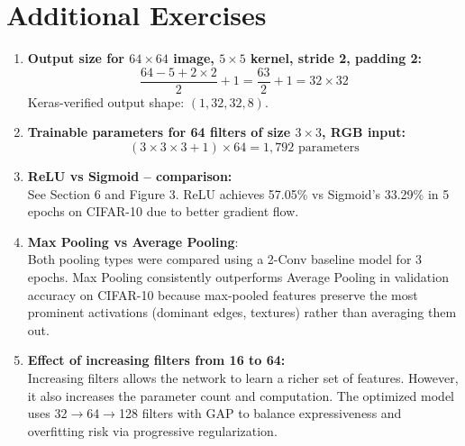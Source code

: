 \documentclass[11pt]{article}
\begin{document}
\section{Additional Exercises}

\begin{enumerate}
    \item \textbf{Output size for $64\times64$ image, $5\times5$ kernel, stride 2, padding 2:}
    $$\frac{64 - 5 + 2 \times 2}{2} + 1 = \frac{63}{2} + 1 = 32 \times 32$$
    Keras-verified output shape: $(1, 32, 32, 8)$.

    \item \textbf{Trainable parameters for 64 filters of size $3\times3$, RGB input:}
    $$(3 \times 3 \times 3 + 1) \times 64 = 1{,}792 \text{ parameters}$$

    \item \textbf{ReLU vs Sigmoid -- comparison:}\\
    See Section 6 and Figure 3. ReLU achieves 57.05\% vs Sigmoid's 33.29\% in 5 epochs on CIFAR-10 due to better gradient flow.

    \item \textbf{Max Pooling vs Average Pooling}:\\ Both pooling types were compared using a 2-Conv baseline model for 3 epochs. Max Pooling consistently outperforms Average Pooling in validation accuracy on CIFAR-10 because max-pooled features preserve the most prominent activations (dominant edges, textures) rather than averaging them out.

    \item \textbf{Effect of increasing filters from 16 to 64:}\\
    Increasing filters allows the network to learn a richer set of features. However, it also increases the parameter count and computation. The optimized model uses 32$\to$64$\to$128 filters with GAP to balance expressiveness and overfitting risk via progressive regularization.
\end{enumerate}

\end{document}
